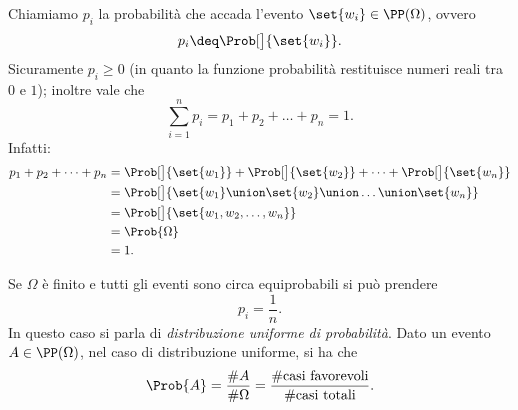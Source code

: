Chiamiamo $p_i$ la probabilità che accada l'evento $\set{w_i} \in \PP(\Omega)$, ovvero \[
    p_i \deq \Prob[\big]{\set{w_i}}.    
\] Sicuramente $p_i \geq 0$ (in quanto la funzione probabilità restituisce numeri reali tra $0$ e $1$); inoltre vale che \[
    \sum_{i=1}^n p_i = p_1 + p_2 + \dots + p_n = 1.    
\] Infatti: \begin{align*}
    p_1 + p_2 + \dots + p_n &= \Prob[\big]{\set{w_1}} + \Prob[\big]{\set{w_2}} + \dots + \Prob[\big]{\set{w_n}}\\
    &= \Prob[\big]{\set{w_1} \union \set{w_2} \union \dots \union \set{w_n}}\\
    &= \Prob[\big]{\set{w_1, w_2, \dots, w_n}}\\
    &= \Prob{\Omega}\\
    &= 1.
\end{align*}

Se $\Omega$ è finito e tutti gli eventi sono circa equiprobabili si può prendere \[
    p_i = \frac1n.    
\] In questo caso si parla di \emph{distribuzione uniforme di probabilità}. Dato un evento $A \in \PP(\Omega)$, nel caso di distribuzione uniforme, si ha che \[
    \Prob{A} = \frac{\#A}{\#\Omega} = \frac{\#\text{casi favorevoli}}{\#\text{casi totali}}.   
\]